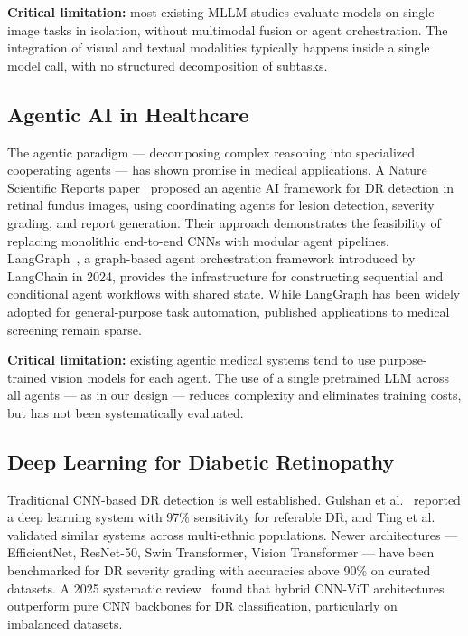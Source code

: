 \documentclass[11pt,a4paper]{article}
\begin{document}
\textbf{Critical limitation:} most existing MLLM studies evaluate models on single-image tasks in isolation, without multimodal fusion or agent orchestration. The integration of visual and textual modalities typically happens inside a single model call, with no structured decomposition of subtasks.

\subsection{Agentic AI in Healthcare}

The agentic paradigm --- decomposing complex reasoning into specialized cooperating agents --- has shown promise in medical applications. A Nature Scientific Reports paper~\cite{nature2025agentic} proposed an agentic AI framework for DR detection in retinal fundus images, using coordinating agents for lesion detection, severity grading, and report generation. Their approach demonstrates the feasibility of replacing monolithic end-to-end CNNs with modular agent pipelines. LangGraph~\cite{langgraph2024}, a graph-based agent orchestration framework introduced by LangChain in 2024, provides the infrastructure for constructing sequential and conditional agent workflows with shared state. While LangGraph has been widely adopted for general-purpose task automation, published applications to medical screening remain sparse.

\textbf{Critical limitation:} existing agentic medical systems tend to use purpose-trained vision models for each agent. The use of a single pretrained LLM across all agents --- as in our design --- reduces complexity and eliminates training costs, but has not been systematically evaluated.

\subsection{Deep Learning for Diabetic Retinopathy}

Traditional CNN-based DR detection is well established. Gulshan et al.~\cite{gulshan2016jama} reported a deep learning system with 97\% sensitivity for referable DR, and Ting et al.~\cite{ting2017jama} validated similar systems across multi-ethnic populations. Newer architectures --- EfficientNet, ResNet-50, Swin Transformer, Vision Transformer --- have been benchmarked for DR severity grading with accuracies above 90\% on curated datasets. A 2025 systematic review~\cite{jmiir2025} found that hybrid CNN-ViT architectures outperform pure CNN backbones for DR classification, particularly on imbalanced datasets.
\end{document}
